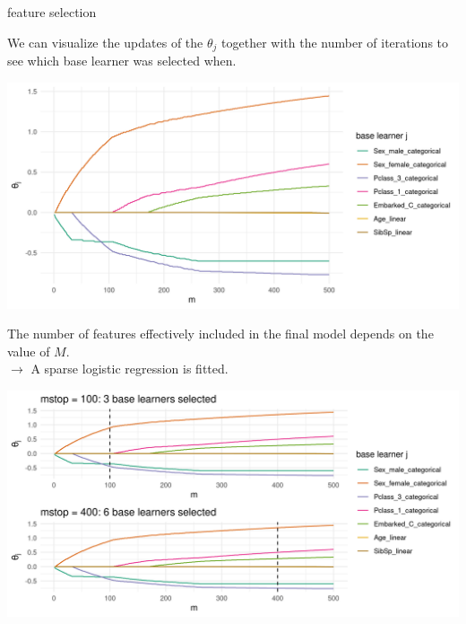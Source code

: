 
\begin{vbframe}{feature selection}

We can visualize the updates of the $\theta_j$ together with the number of 
iterations to see which base learner was selected when.

\vfill

\begin{center}
\includegraphics[width = \textwidth]{figure/compboost-illustration-1.png}
\end{center}

\framebreak





The number of features effectively included in the final model depends on the 
value of $M$. \\

$\rightarrow$ A sparse logistic regression is fitted.

\vfill

\includegraphics[width = \textwidth]{figure/compboost-illustration-2.png}

% 
% 

\end{vbframe}

